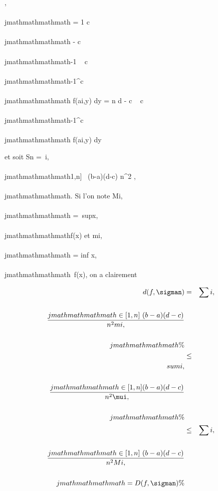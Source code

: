 \mui,\\\\jmathmathmathmath = 1 \over c\\\\jmathmathmathmath -
c\\\\jmathmathmathmath-1 \int ~
c\\\\jmathmathmathmath-1^c\\\\jmathmathmathmath f(ai,y) dy = n
\over d - c \int ~
c\\\\jmathmathmathmath-1^c\\\\jmathmathmathmath f(ai,y) dy

et soit Sn =\
\sum  i,\\\\jmathmathmathmath\in{[}1,n{]}~ (b-a)(d-c)
\over n^2 \mui,\\\\jmathmathmathmath. Si l'on note
Mi,\\\\jmathmathmathmath =\
supx\inPi,\\\\jmathmathmathmathf(x) et mi,\\\\jmathmathmathmath
= inf x\inPi,\\\\jmathmathmathmath~f(x), on a
clairement

\begin{align*} d(f,\sigman)& =&
\sum i,\\\\jmathmathmathmath\in{[}1,n{]}~ (b - a)(d - c)
\over n^2 mi,\\\\jmathmathmathmath \%&
\\ & \leq& \\sum
i,\\\\jmathmathmathmath\in{[}1,n{]} (b - a)(d - c) \over
n^2 \mui,\\\\jmathmathmathmath \%& \\ &
\leq& \sum i,\\\\jmathmathmathmath\in{[}1,n{]}~ (b - a)(d - c)
\over n^2 Mi,\\\\jmathmathmathmath =
D(f,\sigman)\%& \\
\end{align*}

